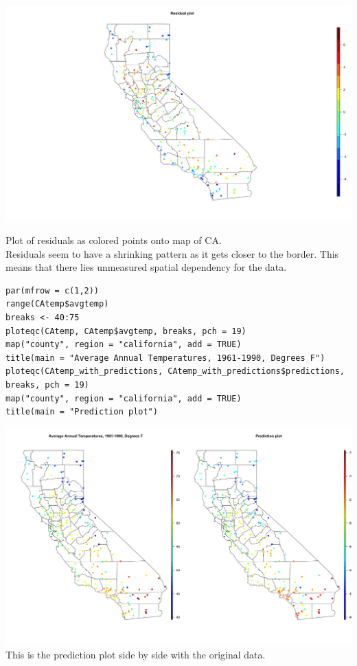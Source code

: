 \documentclass[11pt]{article}
\begin{document}
\includegraphics[scale=0.1]{residual_plot.png}

Plot of residuals as colored points onto map of CA. \\
Residuals seem to have a shrinking pattern as it gets closer to the border.
This means that there lies unmeasured spatial dependency for the data.
\begin{lstlisting}
par(mfrow = c(1,2))
range(CAtemp$avgtemp)
breaks <- 40:75
ploteqc(CAtemp, CAtemp$avgtemp, breaks, pch = 19)
map("county", region = "california", add = TRUE)
title(main = "Average Annual Temperatures, 1961-1990, Degrees F")
ploteqc(CAtemp_with_predictions, CAtemp_with_predictions$predictions, breaks, pch = 19)
map("county", region = "california", add = TRUE)
title(main = "Prediction plot")
\end{lstlisting}

\includegraphics[scale=0.18]{prediction_plot.png}
This is the prediction plot side by side with the original data.
\end{document}
